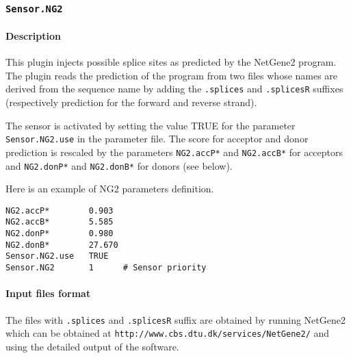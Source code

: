 
\subsubsection{\texttt{Sensor.NG2}}

\paragraph{Description}

This plugin injects possible splice sites as predicted by the
NetGene2 program. The plugin reads the prediction of the
program from two files whose names are derived from the sequence name
by adding the \texttt{.splices} and \texttt{.splicesR} suffixes
(respectively prediction for the forward and reverse strand).

The sensor is activated by setting the value TRUE for the parameter
\texttt{Sensor.NG2.use} in the parameter file. The score for acceptor
and donor prediction is rescaled by the parameters {\tt NG2.accP*} and
{\tt NG2.accB*} for acceptors and {\tt NG2.donP*} and {\tt NG2.donB*} for
donors (see below).

Here is an example of NG2 parameters definition.
\begin{Verbatim}[fontsize=\small]
NG2.accP*        0.903
NG2.accB*        5.585
NG2.donP*        0.980
NG2.donB*        27.670
Sensor.NG2.use   TRUE
Sensor.NG2       1      # Sensor priority
\end{Verbatim}

\paragraph{Input files format}

The files with \texttt{.splices} and \texttt{.splicesR} suffix are
obtained by running NetGene2 which can be obtained at
\texttt{http://www.cbs.dtu.dk/services/NetGene2/} and using the
detailed output of the software.

